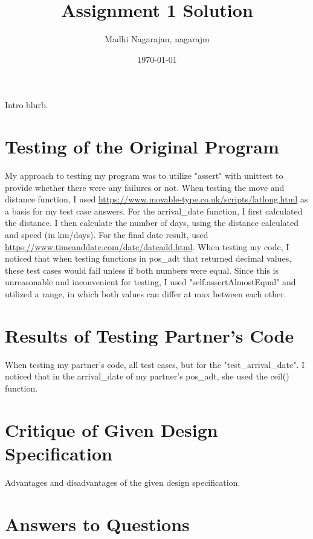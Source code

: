 \documentclass[12pt]{article}
\title{Assignment 1 Solution}
\author{Madhi Nagarajan, nagarajm}
\date{\today}
\begin{document}
\maketitle

Intro blurb.

\section{Testing of the Original Program}
	
	My approach to testing my program was to utilize "assert" with unittest to provide whether there were any failures or not. When testing the move and distance function, I used \url{https://www.movable-type.co.uk/scripts/latlong.html} as a basis for my test case answers. For the arrival\_date function, I first calculated the distance. I then calculate the number of days, using the distance calculated and speed (in km/days). For the final date result, used \url{https://www.timeanddate.com/date/dateadd.html}.
\newline
	When testing my code, I noticed that when testing functions in pos\_adt that returned decimal values, these test cases would fail unless if both numbers were equal. Since this is unreasonable and inconvenient for testing, I used "self.assertAlmostEqual" and utilized a range, in which both values can differ at max between each other.

\section{Results of Testing Partner's Code}

When testing my partner's code, all test cases, but for the "test\_arrival\_date". I noticed that in the arrival\_date of my partner's pos\_adt, she used the ceil() function.

\section{Critique of Given Design Specification}

Advantages and disadvantages of the given design specification.

\section{Answers to Questions}
\end{document}
